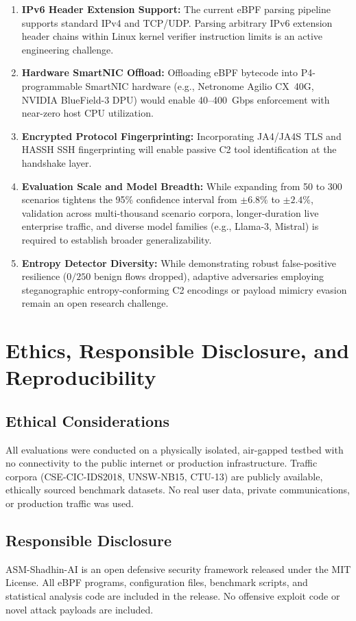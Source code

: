 \documentclass[journal]{IEEEtran}
\renewcommand{\_}{\textunderscore\allowbreak}
\begin{document}
\begin{enumerate}
  \item \textbf{IPv6 Header Extension Support:} The current eBPF parsing pipeline supports standard
  IPv4 and TCP/UDP. Parsing arbitrary IPv6 extension header chains within Linux kernel verifier
  instruction limits is an active engineering challenge.
  \item \textbf{Hardware SmartNIC Offload:} Offloading eBPF bytecode into P4-programmable SmartNIC
  hardware (e.g., Netronome Agilio CX~40G, NVIDIA BlueField-3 DPU) would enable 40--400~Gbps
  enforcement with near-zero host CPU utilization.
  \item \textbf{Encrypted Protocol Fingerprinting:} Incorporating JA4/JA4S TLS and HASSH SSH
  fingerprinting will enable passive C2 tool identification at the handshake layer.
  \item \textbf{Evaluation Scale and Model Breadth:} While expanding from 50 to 300 scenarios
  tightens the 95\% confidence interval from $\pm 6.8\%$ to $\pm 2.4\%$, validation across
  multi-thousand scenario corpora, longer-duration live enterprise traffic, and diverse model
  families (e.g., Llama-3, Mistral) is required to establish broader generalizability.
  \item \textbf{Entropy Detector Diversity:} While demonstrating robust false-positive resilience
  ($0/250$ benign flows dropped), adaptive adversaries employing steganographic entropy-conforming
  C2 encodings or payload mimicry evasion remain an open research challenge.
\end{enumerate}

\section{Ethics, Responsible Disclosure, and Reproducibility}
\subsection{Ethical Considerations}
All evaluations were conducted on a physically isolated, air-gapped testbed with no
connectivity to the public internet or production infrastructure. Traffic corpora
(CSE-CIC-IDS2018, UNSW-NB15, CTU-13) are publicly available, ethically sourced
benchmark datasets. No real user data, private communications, or production traffic
was used.

\subsection{Responsible Disclosure}
ASM-Shadhin-AI is an open defensive security framework released under the MIT
License. All eBPF programs, configuration files, benchmark scripts, and statistical
analysis code are included in the release. No offensive exploit code or novel attack
payloads are included.
\end{document}

